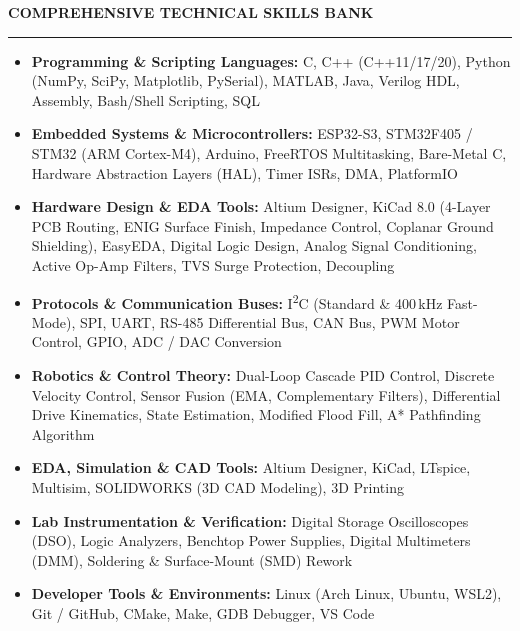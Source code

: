 \documentclass[10pt]{article}
\newcommand{\Section}[1]{%
  \vspace{4.5pt}%
  \textbf{\MakeUppercase{#1}}\par\vspace{-3.5pt}%
  \rule{\linewidth}{0.55pt}\par\vspace{2.5pt}%
}
\begin{document}
\Section{Comprehensive Technical Skills Bank}
\begin{itemize}[leftmargin=0.15in, label={}, itemsep=1.6pt, topsep=1.0pt]
  \item \textbf{Programming \& Scripting Languages:} C, C++ (C++11/17/20), Python (NumPy, SciPy, Matplotlib, PySerial), MATLAB, Java, Verilog HDL, Assembly, Bash/Shell Scripting, SQL
  \item \textbf{Embedded Systems \& Microcontrollers:} ESP32-S3, STM32F405 / STM32 (ARM Cortex-M4), Arduino, FreeRTOS Multitasking, Bare-Metal C, Hardware Abstraction Layers (HAL), Timer ISRs, DMA, PlatformIO
  \item \textbf{Hardware Design \& EDA Tools:} Altium Designer, KiCad 8.0 (4-Layer PCB Routing, ENIG Surface Finish, Impedance Control, Coplanar Ground Shielding), EasyEDA, Digital Logic Design, Analog Signal Conditioning, Active Op-Amp Filters, TVS Surge Protection, Decoupling
  \item \textbf{Protocols \& Communication Buses:} I\textsuperscript{2}C (Standard \& 400\,kHz Fast-Mode), SPI, UART, RS-485 Differential Bus, CAN Bus, PWM Motor Control, GPIO, ADC / DAC Conversion
  \item \textbf{Robotics \& Control Theory:} Dual-Loop Cascade PID Control, Discrete Velocity Control, Sensor Fusion (EMA, Complementary Filters), Differential Drive Kinematics, State Estimation, Modified Flood Fill, A* Pathfinding Algorithm
  \item \textbf{EDA, Simulation \& CAD Tools:} Altium Designer, KiCad, LTspice, Multisim, SOLIDWORKS (3D CAD Modeling), 3D Printing
  \item \textbf{Lab Instrumentation \& Verification:} Digital Storage Oscilloscopes (DSO), Logic Analyzers, Benchtop Power Supplies, Digital Multimeters (DMM), Soldering \& Surface-Mount (SMD) Rework
  \item \textbf{Developer Tools \& Environments:} Linux (Arch Linux, Ubuntu, WSL2), Git / GitHub, CMake, Make, GDB Debugger, VS Code
\end{itemize}
\end{document}
